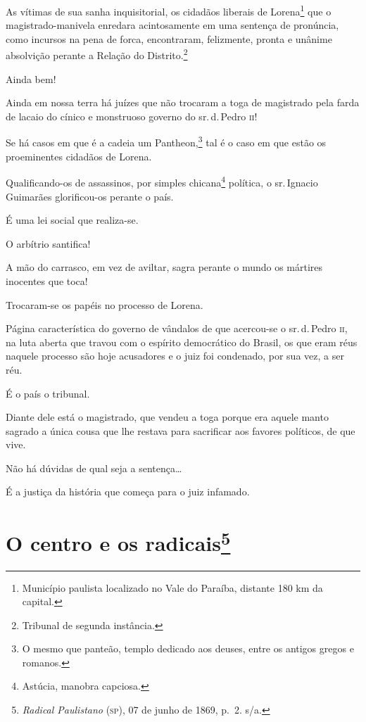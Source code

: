 As vítimas de sua sanha inquisitorial, os cidadãos liberais de
Lorena\footnote{Município paulista localizado no Vale do Paraíba,
  distante 180 km da capital.} que o magistrado-manivela enredara
acintosamente em uma sentença de pronúncia, como incursos na pena de
forca, encontraram, felizmente, pronta e unânime absolvição perante a
Relação do Distrito.\footnote{Tribunal de segunda instância.}

Ainda bem!

Ainda em nossa terra há juízes que não trocaram a toga de magistrado
pela farda de lacaio do cínico e monstruoso governo do sr.\,d.\,Pedro \textsc{ii}!

Se há casos em que é a cadeia um Pantheon,\footnote{O mesmo que
  panteão, templo dedicado aos deuses, entre os antigos gregos e
  romanos.} tal é o caso em que estão os proeminentes cidadãos de
Lorena.

Qualificando-os de assassinos, por simples chicana\footnote{Astúcia,
  manobra capciosa.} política, o sr.\,Ignacio Guimarães glorificou-os
perante o país.

É uma lei social que realiza-se.

O arbítrio santifica!

A mão do carrasco, em vez de aviltar, sagra perante o mundo os mártires
inocentes que toca!

Trocaram-se os papéis no processo de Lorena.

Página característica do governo de vândalos de que acercou-se o sr.\,d.\,Pedro \textsc{ii}, na luta aberta que travou com o espírito democrático do
Brasil, os que eram réus naquele processo são hoje acusadores e o juiz
foi condenado, por sua vez, a ser réu.

É o país o tribunal.

Diante dele está o magistrado, que vendeu a toga porque era aquele manto
sagrado a única cousa que lhe restava para sacrificar aos favores
políticos, de que vive.

Não há dúvidas de qual seja a sentença\ldots{}

É a justiça da história que começa para o juiz infamado.

\chapter{O centro e os radicais\footnote{\emph{Radical Paulistano}
  (\textsc{sp}), 07 de junho de 1869, p.~2. s/a.}}

